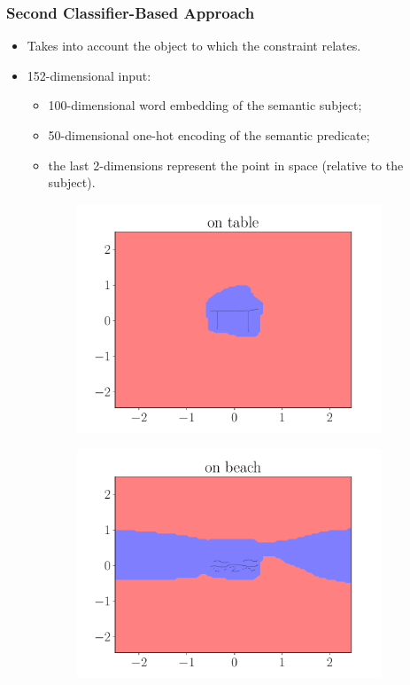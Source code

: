 \documentclass{beamer}
\begin{document}
\begin{frame}
    \frametitle{Second Classifier-Based Approach}
    \begin{itemize}
        \item Takes into account the object to which the constraint relates.
        \item 152-dimensional input:
        \begin{itemize}
            \item 100-dimensional word embedding of the semantic subject;
            \item 50-dimensional one-hot encoding of the semantic predicate;
            \item the last 2-dimensions represent the point in space (relative to the subject).
        \end{itemize}
    \end{itemize}
    \begin{figure}[ht]
        \centering
        \begin{subfigure}{0.45\textwidth}
            \centering
            \includegraphics[width=\textwidth]{figures/on_table}
        \end{subfigure}
        \begin{subfigure}{0.45\textwidth}
            \centering
            \includegraphics[width=\textwidth]{figures/on_beach}

\end{subfigure}
\end{figure}
\end{frame}
\end{document}
